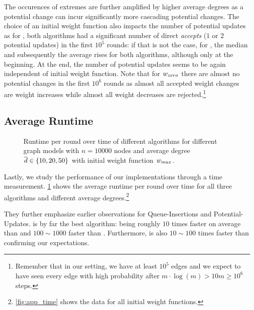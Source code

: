 The occurences of extremes are further amplified by higher average degrees as a potential change can incur significantly more cascading potential changes.
The choice of an initial weight function also impacts the number of potential updates as for \wmax, both algorithms had a significant number of direct \emph{accepts} ($1$ or $2$ potential updates) in the first $10^5$ rounds: if that is not the case, \ie for \wunif, the median and subsequently the average rises for both algorithms, although only at the beginning.
At the end, the number of potential updates seems to be again independent of initial weight function.
Note that for $w_{zero}$ there are almost no potential changes in the first $10^6$ rounds as almost all accepted weight changes are weight increases while almost all weight decreases are rejected.\footnote{
  Remember that in our setting, we have at least $10^5$ edges and we expect to have seen every edge with high probability after $m \cdot \log(m) > 10m \geq 10^6$ steps. 
}


\subsection{Average Runtime}\label{sec:exp_time}
\begin{figure}[!tb]
  \centering
  \caption{
    Runtime per round over time of different algorithms for different graph models with $n = 10000$ nodes and average degree $\overline{d} \in \left\{10, 20, 50\right\}$ with initial weight function $w_{max}$.
  }
  \label{fig:time}
\end{figure}

Lastly, we study the performance of our implementations through a time measurement.
\cref{fig:time} shows the average runtime per round over time for all three algorithms and different average degrees.\footnote{
  \cref{fig:app_time} shows the data for all initial weight functions.
}

They further emphasize earlier observations for Queue-Insertions and Potential-Updates.
\algbd is by far the best algorithm: being roughly $10$ times faster on average than \algdk and $100\sim1000$ faster than \algbf.
Furthermore, \algdk is also $10\sim100$ times faster than \algbf confirming our expectations.

